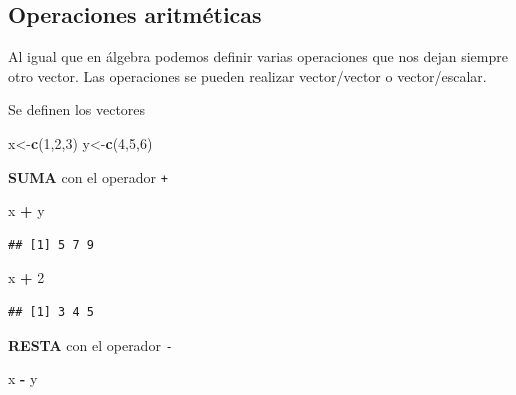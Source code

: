 \documentclass[
]{book}
\newenvironment{Shaded}{\begin{snugshade}}{\end{snugshade}}
\newcommand{\DecValTok}[1]{\textcolor[rgb]{0.00,0.00,0.81}{#1}}
\newcommand{\FunctionTok}[1]{\textcolor[rgb]{0.13,0.29,0.53}{\textbf{#1}}}
\newcommand{\NormalTok}[1]{#1}
\newcommand{\OtherTok}[1]{\textcolor[rgb]{0.56,0.35,0.01}{#1}}
\newcommand{\SpecialCharTok}[1]{\textcolor[rgb]{0.81,0.36,0.00}{\textbf{#1}}}
\begin{document}
\hypertarget{operaciones-aritmuxe9ticas-1}{%
\subsection{Operaciones aritméticas}\label{operaciones-aritmuxe9ticas-1}}

Al igual que en álgebra podemos definir varias operaciones que nos dejan siempre otro vector. Las operaciones se pueden realizar vector/vector o vector/escalar.

Se definen los vectores

\begin{Shaded}
\begin{Highlighting}[]
\NormalTok{x}\OtherTok{\textless{}{-}}\FunctionTok{c}\NormalTok{(}\DecValTok{1}\NormalTok{,}\DecValTok{2}\NormalTok{,}\DecValTok{3}\NormalTok{)}
\NormalTok{y}\OtherTok{\textless{}{-}}\FunctionTok{c}\NormalTok{(}\DecValTok{4}\NormalTok{,}\DecValTok{5}\NormalTok{,}\DecValTok{6}\NormalTok{)}
\end{Highlighting}
\end{Shaded}

\textbf{SUMA} con el operador \texttt{+}

\begin{Shaded}
\begin{Highlighting}[]
\NormalTok{x }\SpecialCharTok{+}\NormalTok{ y }
\end{Highlighting}
\end{Shaded}

\begin{verbatim}
## [1] 5 7 9
\end{verbatim}

\begin{Shaded}
\begin{Highlighting}[]
\NormalTok{x }\SpecialCharTok{+} \DecValTok{2}
\end{Highlighting}
\end{Shaded}

\begin{verbatim}
## [1] 3 4 5
\end{verbatim}

\textbf{RESTA} con el operador \texttt{-}

\begin{Shaded}
\begin{Highlighting}[]
\NormalTok{x }\SpecialCharTok{{-}}\NormalTok{ y}
\end{Highlighting}
\end{Shaded}
\end{document}
